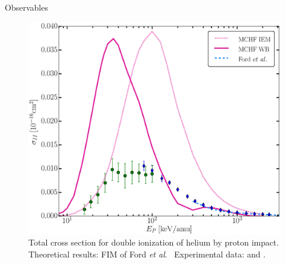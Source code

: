 \documentclass[letterpaper, 12 pt]{report}
\begin{document}
\begin{chapter}{Observables \label{chap:p-he2p-he}}
\begin{figure}[htp]
   \centering
   \includegraphics[width = \linewidth]{./images/phe/phe-II.eps}
   \caption[Total cross section for double ionization of helium by proton impact.]
           {Total cross section for double ionization of helium by proton impact.
            Theoretical results: FIM of Ford \textit{et al}.\ \cite{FR-94}
            Experimental data: {\color{OliveGreen}{$\bullet$}} \cite{SG89} and
            {\color{blue}{$\blacklozenge$}} \cite{SG85}. \label{fig:phe-ii}}
\end{figure}


\end{chapter}
\end{document}
